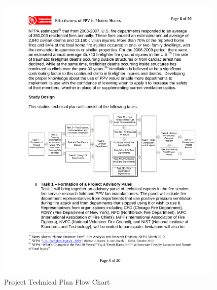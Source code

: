 \documentclass{article}
\begin{document}
\begin{figure}[H]
	\centering
	\includegraphics[width = 6in]{0_Images/Objectives_and_Technical_Plan/DHS2012_TechnicalPlan_FlowChart.pdf}
	\caption{Project Technical Plan Flow Chart}
	\label{fig:TechPlanChart}
\end{figure}

\vspace*{\baselineskip}
\end{document}
